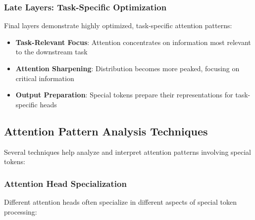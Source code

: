 \subsubsection{Late Layers: Task-Specific Optimization}

Final layers demonstrate highly optimized, task-specific attention patterns:
\begin{itemize}
\item \textbf{Task-Relevant Focus}: Attention concentrates on information most relevant to the downstream task
\item \textbf{Attention Sharpening}: Distribution becomes more peaked, focusing on critical information
\item \textbf{Output Preparation}: Special tokens prepare their representations for task-specific heads
\end{itemize}

\subsection{Attention Pattern Analysis Techniques}

Several techniques help analyze and interpret attention patterns involving special tokens:

\subsubsection{Attention Head Specialization}

Different attention heads often specialize in different aspects of special token processing:

